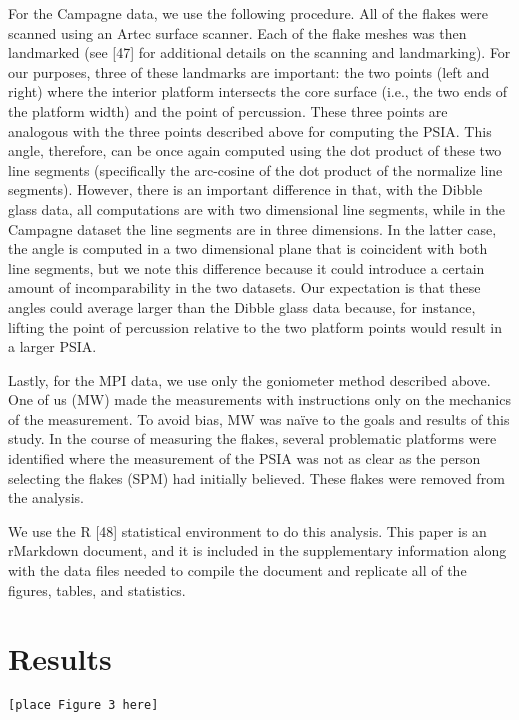 \documentclass[10pt,letterpaper]{article}
\begin{document}
For the Campagne data, we use the following procedure. All of the flakes
were scanned using an Artec surface scanner. Each of the flake meshes
was then landmarked (see {[}47{]} for additional details on the scanning
and landmarking). For our purposes, three of these landmarks are
important: the two points (left and right) where the interior platform
intersects the core surface (i.e., the two ends of the platform width)
and the point of percussion. These three points are analogous with the
three points described above for computing the PSIA. This angle,
therefore, can be once again computed using the dot product of these two
line segments (specifically the arc-cosine of the dot product of the
normalize line segments). However, there is an important difference in
that, with the Dibble glass data, all computations are with two
dimensional line segments, while in the Campagne dataset the line
segments are in three dimensions. In the latter case, the angle is
computed in a two dimensional plane that is coincident with both line
segments, but we note this difference because it could introduce a
certain amount of incomparability in the two datasets. Our expectation
is that these angles could average larger than the Dibble glass data
because, for instance, lifting the point of percussion relative to the
two platform points would result in a larger PSIA.

Lastly, for the MPI data, we use only the goniometer method described
above. One of us (MW) made the measurements with instructions only on
the mechanics of the measurement. To avoid bias, MW was naïve to the
goals and results of this study. In the course of measuring the flakes,
several problematic platforms were identified where the measurement of
the PSIA was not as clear as the person selecting the flakes (SPM) had
initially believed. These flakes were removed from the analysis.

We use the R {[}48{]} statistical environment to do this analysis. This
paper is an rMarkdown document, and it is included in the supplementary
information along with the data files needed to compile the document and
replicate all of the figures, tables, and statistics.

\hypertarget{results}{%
\section{Results}\label{results}}

\begin{verbatim}
[place Figure 3 here]
\end{verbatim}
\end{document}
